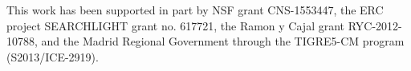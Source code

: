 This work has been supported in part by  NSF grant CNS-1553447, the ERC project
SEARCHLIGHT grant no. 617721, the Ramon y Cajal grant
RYC-2012-10788, and the Madrid Regional Government through
the TIGRE5-CM program (S2013/ICE-2919).
